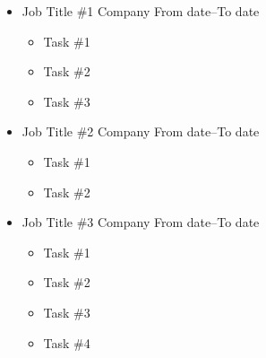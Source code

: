\documentclass[11pt,a4paper]{article}
\begin{document}
\begin{minipage}[t][20cm]{11cm}%
    \vspace*{0.1cm}%
    \begin{itemize}[%
        leftmargin=*,%
        rightmargin=-1cm,%
        label=\textcolor{\defaultcolor}{\textbullet},%
        itemsep=-0.3cm%
        ]%
        \item \workexperienceentry%
            {Job Title \#1}%
            {Company}%
            {From date--To date}%
            {%
                \begin{multicols}{2}%
                    \begin{itemize}[label=$\circ$]%
                        \item Task \#1%
                        \item Task \#2%
                        \item Task \#3%
                    \end{itemize}%
                \end{multicols}%
            }%
        \item[\linkedlist{a}]\workexperienceentry%
            {Job Title \#2}%
            {Company}%
            {From date--To date}%
            {%
                \begin{multicols}{2}%
                    \begin{itemize}[label=$\circ$]%
                        \item Task \#1%
                        \item Task \#2%
                    \end{itemize}%
                \end{multicols}%
            }%
        \item[\linkedlist{b}]\workexperienceentry%
            {Job Title \#3}%
            {Company}%
            {From date--To date}%
            {%
                \begin{multicols}{2}%
                    \begin{itemize}[label=$\circ$]%
                        \item Task \#1%
                        \item Task \#2%
                        \item Task \#3%
                        \item Task \#4%
                    \end{itemize}%
                \end{multicols}%
}
\end{itemize}
\end{minipage}
\end{document}
